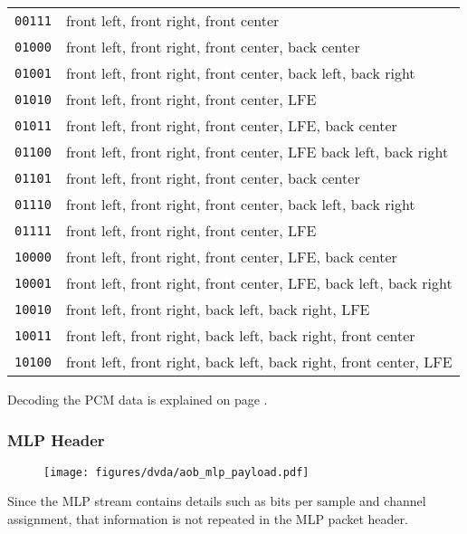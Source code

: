 \begin{table}[h]
{{\begin{tabular}{|c|l|}
\texttt{00111} & front left, front right, front center \\
\texttt{01000} & front left, front right, front center, back center \\
\texttt{01001} & front left, front right, front center, back left, back right \\
\texttt{01010} & front left, front right, front center, LFE\\
\texttt{01011} & front left, front right, front center, LFE, back center \\
\texttt{01100} & front left, front right, front center, LFE back left, back right \\
\texttt{01101} & front left, front right, front center, back center \\
\texttt{01110} & front left, front right, front center, back left, back right \\
\texttt{01111} & front left, front right, front center, LFE \\
\texttt{10000} & front left, front right, front center, LFE, back center \\
\texttt{10001} & front left, front right, front center, LFE, back left, back right \\
\texttt{10010} & front left, front right, back left, back right, LFE \\
\texttt{10011} & front left, front right, back left, back right, front center \\
\texttt{10100} & front left, front right, back left, back right, front center, LFE \\
\hline
\end{tabular}
}
}
\end{table}
\par
\noindent

Decoding the PCM data is explained on page \pageref{aob_pcm}.

\clearpage

\subsubsection{MLP Header}

\begin{figure}[h]
\texttt{[image: figures/dvda/aob\_mlp\_payload.pdf]}
\end{figure}
\par
\noindent
Since the MLP stream contains details such as bits per sample
and channel assignment, that information is not repeated in the MLP
packet header.

